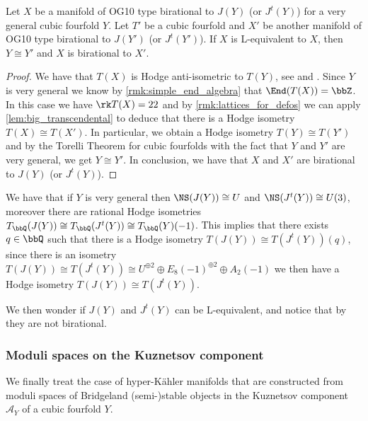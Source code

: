 \documentclass{amsart}
\begin{document}
\begin{proposition}\label{prop:LSV}
    Let \(X\) be a manifold of OG10 type birational to \(J(Y)\) (or \(J^t(Y)\)) for a very general cubic fourfold \(Y\). Let \(T'\) be a cubic fourfold and \(X'\) be another manifold of OG10 type birational to \(J(Y')\) (or \(J^t(Y')\)). If \(X\) is L-equivalent to \(X\), then \(Y\cong Y'\) and \(X\) is birational to \(X'\).
\end{proposition}

\begin{proof}

   We have that \(T(X)\) is Hodge anti-isometric to \(T(Y)\), see \cite{laza2017hyper,Sacca_birationality_twisted} and \cite[Proposition 5.1]{billi2024non}. Since $Y$ is very general we know by \autoref{rmk:simple_end_algebra} that \(\End(T(X))=\bbZ\). In this case we have \(\rk T(X)=22\) and by \autoref{rmk:lattices_for_defos} we can apply \autoref{lem:big_transcendental} to deduce that there is a Hodge isometry \(T(X)\cong T(X')\). In particular, we obtain a Hodge isometry \(T(Y)\cong T(Y')\) and by the Torelli Theorem for cubic fourfolds \cite{voisin1986theoreme} with the fact that \(Y\) and \(Y'\) are very general, we get \(Y\cong Y'\).
    In conclusion, we have that \(X\) and \(X'\) are birational to \(J(Y)\) (or \(J^t(Y)\)).
\end{proof}

We have that if \(Y\) is very general then \(\NS(J(Y))\cong U\) and \(\NS(J^t(Y))\cong U(3)\), moreover there are rational Hodge isometries \(T_\bbQ(J(Y))\cong T_\bbQ(J^t(Y))\cong T_\bbQ(Y)(-1)\). This implies that there exists \(q\in \bbQ\) such that there is a Hodge isometry \(T(J(Y))\cong T(J^t(Y))(q)\), since there is an isometry \(T(J(Y))\cong T(J^t(Y))\cong U^{\oplus 2}\oplus E_8(-1)^{\oplus 2}\oplus A_2(-1)\) we then have a Hodge isometry \(T(J(Y))\cong T(J^t(Y))\). 

We then wonder if \(J(Y)\) and \(J^t(Y)\) can be L-equivalent, and notice that by \cite[Corollary 3.10]{Sacca_birationality_twisted} they are not birational.

\subsubsection{Moduli spaces on the Kuznetsov component}
We finally treat the case of hyper-Kähler manifolds that are constructed from moduli spaces of Bridgeland (semi-)stable objects in the Kuznetsov component \(\mathcal{A}_Y\) of a cubic fourfold \(Y\). 
\end{document}
